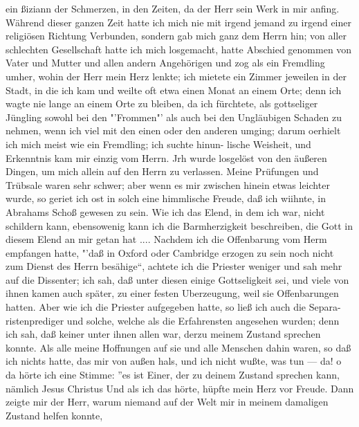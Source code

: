 ein ßiziann der Schmerzen, in den Zeiten, da der Herr sein Werk
in mir anfing.
Während dieser ganzen Zeit hatte ich mich nie mit irgend
jemand zu irgend einer religiösen Richtung Verbunden, sondern
gab mich ganz dem Herrn hin; von aller schlechten Gesellschaft
hatte ich mich losgemacht, hatte Abschied genommen von Vater
und Mutter und allen andern Angehörigen und zog als ein
Fremdling umher, wohin der Herr mein Herz lenkte; ich mietete
ein Zimmer jeweilen in der Stadt, in die ich kam und weilte oft
etwa einen Monat an einem Orte; denn ich wagte nie lange an
einem Orte zu bleiben, da ich fürchtete, als gottseliger Jüngling
sowohl bei den "'Frommen"' als auch bei den Ungläubigen Schaden
zu nehmen, wenn ich viel mit den einen oder den anderen umging;
darum oerhielt ich mich meist wie ein Fremdling; ich suchte hinun-
lische Weisheit, und Erkenntnis kam mir einzig vom Herrn. Jrh
wurde losgelöst von den äußeren Dingen, um mich allein auf
den Herrn zu verlassen. Meine Prüfungen und Trübsale waren
sehr schwer; aber wenn es mir zwischen hinein etwas leichter
wurde, so geriet ich ost in solch eine himmlische Freude, daß ich
wiihnte, in Abrahams Schoß gewesen zu sein. Wie ich das Elend,
in dem ich war, nicht schildern kann, ebensowenig kann ich die
Barmherzigkeit beschreiben, die Gott in diesem Elend an mir getan
hat ....
Nachdem ich die Offenbarung vom Herm empfangen hatte,
"'daß in Oxford oder Cambridge erzogen zu sein noch nicht zum
Dienst des Herrn besähige"`, achtete ich die Priester weniger und
sah mehr auf die Dissenter; ich sah, daß unter diesen einige
Gottseligkeit sei, und viele von ihnen kamen auch später, zu einer
festen Uberzeugung, weil sie Offenbarungen hatten. Aber wie
ich die Priester aufgegeben hatte, so ließ ich auch die Separa-
ristenprediger und solche, welche als die Erfahrensten angesehen
wurden; denn ich sah, daß keiner unter ihnen allen war, derzu meinem
Zustand sprechen konnte. Als alle meine Hoffnungen auf sie und alle
Menschen dahin waren, so daß ich nichts hatte, das mir von außen
hals, und ich nicht wußte, was tun — da! o da hörte ich eine
Stimme: "'es ist Einer, der zu deinem Zustand sprechen kann,
nämlich Jesus Christus Und als ich das hörte, hüpfte mein
Herz vor Freude. Dann zeigte mir der Herr, warum niemand
auf der Welt mir in meinem damaligen Zustand helfen konnte,

